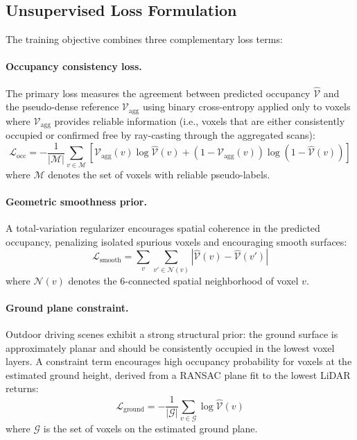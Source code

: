 \documentclass[a4paper, 12pt]{article}
\begin{document}
	\subsection{Unsupervised Loss Formulation}
	
	The training objective combines three complementary loss terms:
	
	\paragraph{Occupancy consistency loss.} The primary loss measures the
	agreement between predicted occupancy $\hat{\mathcal{V}}$ and the pseudo-dense
	reference $\mathcal{V}_{\text{agg}}$ using binary cross-entropy applied only
	to voxels where $\mathcal{V}_{\text{agg}}$ provides reliable information
	(i.e., voxels that are either consistently occupied or confirmed free by
	ray-casting through the aggregated scans):
	\begin{equation}
		\mathcal{L}_{\text{occ}} = -\frac{1}{|\mathcal{M}|} \sum_{v \in \mathcal{M}}
		\left[ \mathcal{V}_{\text{agg}}(v) \log \hat{\mathcal{V}}(v) +
		(1 - \mathcal{V}_{\text{agg}}(v)) \log (1 - \hat{\mathcal{V}}(v)) \right]
	\end{equation}
	where $\mathcal{M}$ denotes the set of voxels with reliable pseudo-labels.
	
	\paragraph{Geometric smoothness prior.} A total-variation regularizer
	encourages spatial coherence in the predicted occupancy, penalizing isolated
	spurious voxels and encouraging smooth surfaces:
	\begin{equation}
		\mathcal{L}_{\text{smooth}} = \sum_{v} \sum_{v' \in \mathcal{N}(v)}
		\left| \hat{\mathcal{V}}(v) - \hat{\mathcal{V}}(v') \right|
	\end{equation}
	where $\mathcal{N}(v)$ denotes the 6-connected spatial neighborhood of
	voxel $v$.
	
	\paragraph{Ground plane constraint.} Outdoor driving scenes exhibit a strong
	structural prior: the ground surface is approximately planar and should be
	consistently occupied in the lowest voxel layers. A constraint term encourages
	high occupancy probability for voxels at the estimated ground height, derived
	from a RANSAC plane fit to the lowest LiDAR returns:
	\begin{equation}
		\mathcal{L}_{\text{ground}} = -\frac{1}{|\mathcal{G}|} \sum_{v \in \mathcal{G}}
		\log \hat{\mathcal{V}}(v)
	\end{equation}
	where $\mathcal{G}$ is the set of voxels on the estimated ground plane.
	
\end{document}
